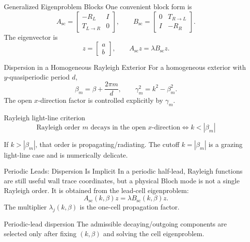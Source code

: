 \documentclass[aspectratio=169]{beamer}
\begin{document}
\begin{frame}{Generalized Eigenproblem Blocks}
  One convenient block form is
  \[
    A_{\mathrm{sc}}
    =
    \begin{bmatrix}
      -R_L & I\\
      T_{L\to R} & 0
    \end{bmatrix},
    \qquad
    B_{\mathrm{sc}}
    =
    \begin{bmatrix}
      0 & T_{R\to L}\\
      I & -R_R
    \end{bmatrix}.
  \]
  The eigenvector is
  \[
    z=
    \begin{bmatrix}a\\b\end{bmatrix},
    \qquad
    A_{\mathrm{sc}}z=\lambda B_{\mathrm{sc}}z.
  \]
\end{frame}

\begin{frame}{Dispersion in a Homogeneous Rayleigh Exterior}
  For a homogeneous exterior with \(y\)-quasiperiodic period \(d\),
  \[
    \beta_m=\beta+\frac{2\pi m}{d},
    \qquad
    \gamma_m^2=k^2-\beta_m^2.
  \]
  The open \(x\)-direction factor is controlled explicitly by \(\gamma_m\).
  \begin{block}{Rayleigh light-line criterion}
    \[
      \boxed{
      \text{Rayleigh order }m\text{ decays in the open }x\text{-direction}
      \iff
      k<|\beta_m|
      }
    \]
  \end{block}
  If \(k>|\beta_m|\), that order is propagating/radiating. The cutoff
  \(k=|\beta_m|\) is a grazing light-line case and is numerically delicate.
\end{frame}

\begin{frame}{Periodic Leads: Dispersion Is Implicit}
  In a periodic half-lead, Rayleigh functions are still useful wall trace
  coordinates, but a physical Bloch mode is not a single Rayleigh order.
  It is obtained from the lead-cell eigenproblem:
  \[
    A_{\mathrm{sc}}(k,\beta)z
    =
    \lambda B_{\mathrm{sc}}(k,\beta)z.
  \]
  The multiplier \(\lambda_j(k,\beta)\) is the one-cell propagation factor.
  \begin{block}{Periodic-lead dispersion}
    The admissible decaying/outgoing components are selected only after
    fixing \((k,\beta)\) and solving the cell eigenproblem.
  \end{block}
\end{frame}
\end{document}
